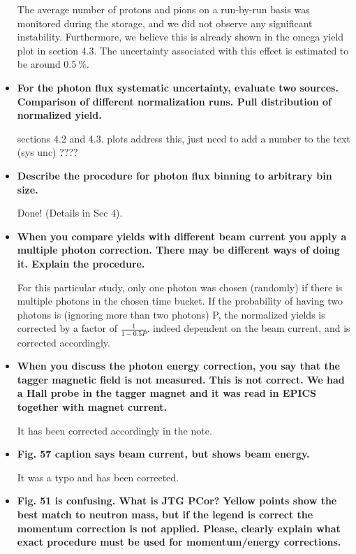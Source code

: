 \documentclass[ 12 pt]{article}
\begin{document}
\begin{itemize}
The average number of protons and pions on a run-by-run basis was monitored during the storage, and we did not observe any significant instability. Furthermore, we believe this is already shown in the omega yield plot in section 4.3. The uncertainty associated with this effect is estimated to be around $0.5~\%$. 

\item \textbf{For the photon flux systematic uncertainty, evaluate two sources.\\
Comparison of different normalization runs.
Pull distribution of normalized yield.}

sections 4.2 and 4.3. plots address this, just need to add a number to the text (sys unc) ????

\item \textbf{Describe the procedure for photon flux binning to arbitrary bin size.}

Done! (Details in Sec 4). 


\item \textbf{When you compare yields with different beam current you apply a multiple 
photon correction. There may be different ways of doing it. Explain the 
procedure.}

For this particular study, only one photon was chosen (randomly) if there is multiple photons in the chosen time bucket. If the probability of having two photons is (ignoring more than two photons) P, the normalized yields is corrected by a factor of $\frac{1}{1-0.5P}$. indeed dependent on the beam current, and is corrected accordingly.

\item \textbf{When you discuss the photon energy correction, you say that the tagger 
magnetic field is not measured. This is not correct. We had a Hall probe in the 
tagger magnet and it was read in EPICS together with magnet current.}

It has been corrected accordingly in the note. 

\item  \textbf{Fig. 57 caption says beam current, but shows beam energy.}

It was a typo and has been corrected.

\item \textbf{Fig. 51 is confusing. What is JTG PCor? Yellow points show the best match to 
neutron mass, but if the legend is correct the momentum correction is not 
applied. Please, clearly explain what exact procedure must be used for 
momentum/energy corrections.}


\end{itemize}
\end{document}
